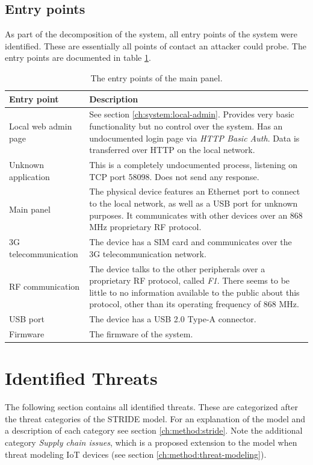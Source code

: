 \subsection{Entry points}
As part of the decomposition of the system, all entry points of the system were identified. These are essentially all points of contact an attacker could probe. The entry points are documented in table \ref{tb:entry-points}.
\begin{table}[!ht]
    \centering
    \begin{tabularx}{\textwidth}{l X}
        \hline
        \textbf{Entry point} & \textbf{Description}
        \\ \hline
        Local web admin page  & See section \ref{ch:system:local-admin}. Provides very basic functionality but no control over the system. Has an undocumented login page via \textit{HTTP Basic Auth}. Data is transferred over HTTP on the local network.
        \\ \hline
        Unknown application  & This is a completely undocumented process, listening on TCP port 58098. Does not send any response.
        \\ \hline
        Main panel  & The physical device features an Ethernet port to connect to the local network, as well as a USB port for unknown purposes. It communicates with other devices over an 868 MHz proprietary \gls{RF} protocol.
        \\ \hline
        3G telecommunication  & The device has a SIM card and communicates over the 3G telecommunication network.
        \\ \hline
        \gls{RF} communication  & The device talks to the other peripherals over a proprietary \gls{RF} protocol, called \textit{F1}. There seems to be little to no information available to the public about this protocol, other than its operating frequency of 868 MHz.
        \\ \hline
        USB port  & The device has a USB 2.0 Type-A connector.
        \\ \hline
        Firmware  & The firmware of the system.
        \\ \hline
    \end{tabularx}
    \caption{The entry points of the main panel.}
    \label{tb:entry-points}
\end{table}

\section{Identified Threats} \label{ch:threat-model:threats}
The following section contains all identified threats. These are categorized after the threat categories of the STRIDE model. For an explanation of the model and a description of each category see section \ref{ch:method:stride}. Note the additional category \textit{Supply chain issues}, which is a proposed extension to the model when threat modeling IoT devices \cite{guzman2017iot} (see section \ref{ch:method:threat-modeling}).

